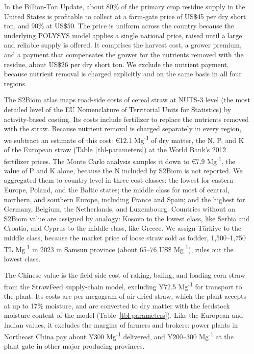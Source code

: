 \documentclass[
  letterpaper,
  twoside,
  twocolumn,
  9pt]{article}
\begin{document}
In the Billion-Ton Update, about 80\% of the primary crop residue supply
in the United States is profitable to collect at a farm-gate price of
US\$45 per dry short ton, and 90\% at US\$50.\citep{perlack2011} The
price is uniform across the country because the underlying POLYSYS model
\citep{delatorreugarte2000} applies a single national price, raised
until a large and reliable supply is offered. It comprises the harvest
cost, a grower premium, and a payment that compensates the grower for
the nutrients removed with the residue, about US\$26 per dry short
ton.\citep{perlack2011} We exclude the nutrient payment, because
nutrient removal is charged explicitly and on the same basis in all four
regions.

The S2Biom atlas maps road-side costs of cereal straw at NUTS-3 level
(the most detailed level of the EU Nomenclature of Territorial Units for
Statistics) by activity-based costing.\citep{dees2017s2biom} Its costs
include fertilizer to replace the nutrients removed with the straw.
Because nutrient removal is charged separately in every region, we
subtract an estimate of this cost: €12.1 Mg\textsuperscript{-1} of dry
matter, the N, P, and K of the European straw
(Table~\ref{tbl-parameters}) at the World Bank's 2012 fertilizer
prices.\citep{worldbank2026pinksheet} The Monte Carlo analysis samples
it down to €7.9 Mg\textsuperscript{-1}, the value of P and K alone,
because the N included by S2Biom is not reported. We aggregated them to
country level in three cost classes: the lowest for eastern Europe,
Poland, and the Baltic states; the middle class for most of central,
northern, and southern Europe, including France and Spain; and the
highest for Germany, Belgium, the Netherlands, and Luxembourg. Countries
without an S2Biom value are assigned by analogy: Kosovo to the lowest
class, like Serbia and Croatia, and Cyprus to the middle class, like
Greece. We assign Türkiye to the middle class, because the market price
of loose straw sold as fodder, 1,500--1,750 TL Mg\textsuperscript{-1} in
2023 in Samsun province (about 65--76 US\$ Mg\textsuperscript{-1}),
rules out the lowest class.\citep{tek2026saman}

The Chinese value is the field-side cost of raking, baling, and loading
corn straw from the StrawFeed supply-chain model, excluding ¥72.5
Mg\textsuperscript{-1} for transport to the
plant.\citep{wang2022strawfeed} Its costs are per megagram of air-dried
straw, which the plant accepts at up to 17\% moisture, and are converted
to dry matter with the feedstock moisture content of the model
(Table~\ref{tbl-parameters}). Like the European and Indian values, it
excludes the margins of farmers and brokers: power plants in Northeast
China pay about ¥300 Mg\textsuperscript{-1} delivered, and ¥200--300
Mg\textsuperscript{-1} at the plant gate in other major producing
provinces.\citep{wang2022strawfeed}
\end{document}
